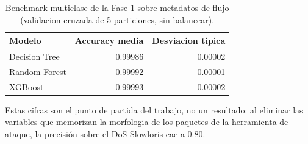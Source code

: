 \begin{table}[htbp]
  \centering
  \caption{Benchmark multiclase de la Fase 1 sobre metadatos de flujo (validacion cruzada de 5 particiones, sin balancear).}
  \label{tab:fase1}
  \begin{tabular}{lrr}
    \toprule
    \textbf{Modelo} & \textbf{Accuracy media} & \textbf{Desviacion tipica} \\
    \midrule
    Decision Tree & 0.99986 & 0.00002 \\
    Random Forest & 0.99992 & 0.00001 \\
    XGBoost & 0.99993 & 0.00002 \\
    \bottomrule
  \end{tabular}
  \par\smallskip\footnotesize{Estas cifras son el punto de partida del trabajo, no un resultado: al eliminar las variables que memorizan la morfologia de los paquetes de la herramienta de ataque, la precisión sobre el DoS-Slowloris cae a 0.80.}
\end{table}
